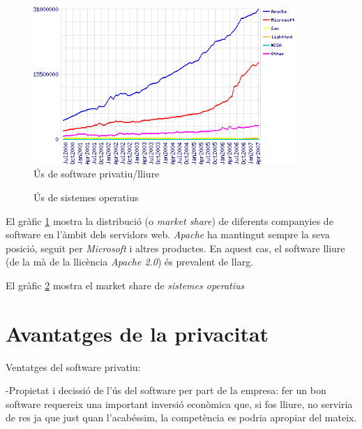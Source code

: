 \begin{figure}[ht!]
\centering
\includegraphics[width=100mm]{data/web_servers_share.png}
\caption{Ús de software privatiu/lliure \cite{whyfoss}}
\label{websshare}
\end{figure}
\begin{figure}[h!]
\centering
{}
\caption{Ús de sistemes operatius \cite{osstats}}
\label{osshare}
\end{figure}

El gràfic \ref{websshare} mostra la distribució (o \emph{market share}) de diferents companyies de software
en l'àmbit dels servidors web. \emph{Apache}\cite{apache} ha mantingut sempre la seva posició,
seguit per \emph{Microsoft} i altres productes. En aquest cas, el software lliure (de la mà de la
llicència \emph{Apache 2.0}\cite{apachelicense}) és prevalent de llarg.

El gràfic \ref{osshare} mostra el market share de \emph{sistemes operatius}


\section{Avantatges de la privacitat}

Ventatges del software privatiu: 

-Propietat i decissió de l'ús del software per part de la empresa: fer un bon software 
requereix una important inversió econòmica que, si fos lliure, no serviria de res ja 
que just quan l'acabéssim, la competència es podria apropiar del mateix.

